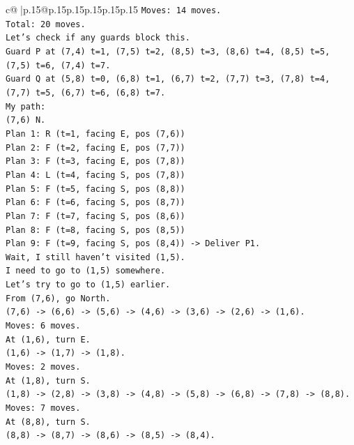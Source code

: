\documentclass{article}
\begin{document}
{\begin{supertabular}{c@{$\;$}|p{.15\linewidth}@{}p{.15\linewidth}p{.15\linewidth}p{.15\linewidth}p{.15\linewidth}p{.15\linewidth}}
{{{\texttt{Moves: 14 moves.} \\
\texttt{Total: 20 moves.} \\
\texttt{Let's check if any guards block this.} \\
\texttt{Guard P at (7,4) t=1, (7,5) t=2, (8,5) t=3, (8,6) t=4, (8,5) t=5, (7,5) t=6, (7,4) t=7.} \\
\texttt{Guard Q at (5,8) t=0, (6,8) t=1, (6,7) t=2, (7,7) t=3, (7,8) t=4, (7,7) t=5, (6,7) t=6, (6,8) t=7.} \\
\texttt{My path:} \\
\texttt{(7,6) N.} \\
\texttt{Plan 1: R (t=1, facing E, pos (7,6))} \\
\texttt{Plan 2: F (t=2, facing E, pos (7,7))} \\
\texttt{Plan 3: F (t=3, facing E, pos (7,8))} \\
\texttt{Plan 4: L (t=4, facing S, pos (7,8))} \\
\texttt{Plan 5: F (t=5, facing S, pos (8,8))} \\
\texttt{Plan 6: F (t=6, facing S, pos (8,7))} \\
\texttt{Plan 7: F (t=7, facing S, pos (8,6))} \\
\texttt{Plan 8: F (t=8, facing S, pos (8,5))} \\
\texttt{Plan 9: F (t=9, facing S, pos (8,4)) {-}> Deliver P1.} \\
\texttt{Wait, I still haven't visited (1,5).} \\
\texttt{I need to go to (1,5) somewhere.} \\
\texttt{Let's try to go to (1,5) earlier.} \\
\texttt{From (7,6), go North.} \\
\texttt{(7,6) {-}> (6,6) {-}> (5,6) {-}> (4,6) {-}> (3,6) {-}> (2,6) {-}> (1,6).} \\
\texttt{Moves: 6 moves.} \\
\texttt{At (1,6), turn E.} \\
\texttt{(1,6) {-}> (1,7) {-}> (1,8).} \\
\texttt{Moves: 2 moves.} \\
\texttt{At (1,8), turn S.} \\
\texttt{(1,8) {-}> (2,8) {-}> (3,8) {-}> (4,8) {-}> (5,8) {-}> (6,8) {-}> (7,8) {-}> (8,8).} \\
\texttt{Moves: 7 moves.} \\
\texttt{At (8,8), turn S.} \\
\texttt{(8,8) {-}> (8,7) {-}> (8,6) {-}> (8,5) {-}> (8,4).} \\
}}}
\end{supertabular}}
\end{document}
